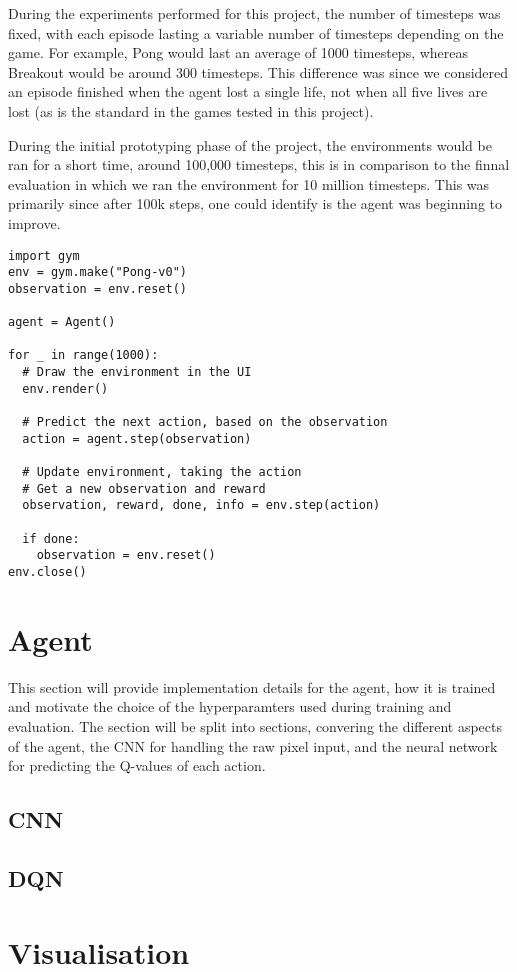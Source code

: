 During the experiments performed for this project, the number of timesteps was fixed, with each episode lasting a variable number of timesteps depending on the game. For example, Pong would last an average of 1000 timesteps, whereas Breakout would be around 300 timesteps. This difference was since we considered an episode finished when the agent lost a single life, not when all five lives are lost (as is the standard in the games tested in this project).

During the initial prototyping phase of the project, the environments would be ran for a short time, around 100,000 timesteps, this is in comparison to the finnal evaluation in which we ran the environment for 10 million timesteps. This was primarily since after 100k steps, one could identify is the agent was beginning to improve.

\begin{code}
  \label{code:basic-gym}
  \begin{verbatim}
import gym
env = gym.make("Pong-v0")
observation = env.reset()

agent = Agent()

for _ in range(1000):
  # Draw the environment in the UI
  env.render()

  # Predict the next action, based on the observation
  action = agent.step(observation)

  # Update environment, taking the action
  # Get a new observation and reward
  observation, reward, done, info = env.step(action)

  if done:
    observation = env.reset()
env.close()
\end{verbatim}
\end{code}

\section{Agent}
This section will provide implementation details for the agent, how it is trained and motivate the choice of the hyperparamters used during training and evaluation. The section will be split into sections, convering the different aspects of the agent, the CNN for handling the raw pixel input, and the neural network for predicting the Q-values of each action.

\subsection{CNN}

\subsection{DQN}

\section{Visualisation}